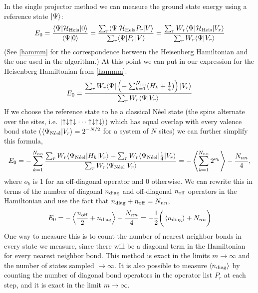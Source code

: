 In the single projector method we can measure the ground state energy using a reference state $\lvert {\Psi} \rangle$:
\begin{equation}
	E_0 = \frac{\langle {\Psi} \rvert\mathcal{H}_{\rm Heis}\lvert {0} \rangle}{\langle {\Psi} \rvert0\rangle} = 
	\frac{\sum_{r} \langle {\Psi} \rvert\mathcal{H}_{\rm Heis} P_r \lvert {V} \rangle}
	{\sum_{r}  \langle {\Psi} \rvert P_r \lvert {V} \rangle}= 
	\frac{\sum_{r} W_r \langle {\Psi} \rvert\mathcal{H}_{\rm Heis}  \lvert {V_r} \rangle}
	{\sum_{r} W_r \langle {\Psi} \rvert V_r\rangle}
\end{equation}
(See \eqref{hammm} for the correspondence between the Heisenberg Hamiltonian and the one used in the algorithm.)
At this point we can put in our expression for the Heisenberg Hamiltonian from \eqref{hammm}.
\begin{equation}
	E_0 =
	\frac{\sum_{r} W_r \langle {\Psi} \rvert \left(-\sum_{k=1}^{N_{nn}} (H_k+ \frac{1}{4})\right) \lvert {V_r} \rangle}
	{\sum_{r} W_r \langle {\Psi} \rvert V_r\rangle}
\end{equation}
If we choose the reference state to be a classical N\'eel state (the spins alternate over the sites, i.e. $\lvert {\uparrow\downarrow\uparrow\downarrow\cdots\uparrow\downarrow\uparrow\downarrow} \rangle$) 
which has equal overlap with every valence bond state ($\langle {\Psi_{\rm N\acute{e}el} } \rvert V_r\rangle =  2^{-N/2}$ for a system of $N$ sites) 
we can further simplify this formula,
\begin{equation}
	E_0 = 
	-\sum_{k=1}^{N_{nn}}\frac{\sum_{r} W_r \langle {\Psi_{\rm N\acute{e}el} } \rvert H_k \lvert {V_{r}} \rangle + 
	\sum_{r} W_r  \langle {\Psi_{\rm N\acute{e}el} } \rvert\frac{1}{4} \lvert {V_{r}} \rangle}
	{\sum_{r} W_r \langle {\Psi_{\rm N\acute{e}el}} \rvert V_{r}\rangle}
	=
	-\left<\sum_{k=1}^{N_{nn}} 2^{o_k}\right> -  \frac{N_{nn}}{4},	
	 \label{energyy}
\end{equation}
where $o_k$ is 1 for an off-diagonal operator and 0 otherwise.  
We can rewrite this in terms of the number of diagonal  $n_{\rm diag}$ and off-diagonal $n_{\rm off}$ operators in the Hamiltonian and use the fact that  $ n_{\rm diag} + n_{\rm off}= N_{nn}$,
\begin{equation}
	E_0
	= 
	-\left< \frac{n_{\text{off}}}{2} + n_{\text{diag}}\right> - \frac{N_{nn}}{4}
	 \label{energyyy} 
	 = -\frac{1}{2}\bigg(\left<n_{\rm diag} \right>+N_{nn}\bigg)
\end{equation}
One way to measure this is to count the number of nearest neighbor bonds in every state we measure, since there will be a diagonal term in the Hamiltonian for every nearest neighbor bond.  This method is exact in the limits $m \rightarrow \infty$ and the number of states sampled $ \rightarrow \infty$.
It is also possible to measure $\left<n_{\rm diag} \right>$ by counting the number of diagonal bond operators in the operator list $P_r$ at each step, and it is exact in the limit $m \rightarrow \infty$.

